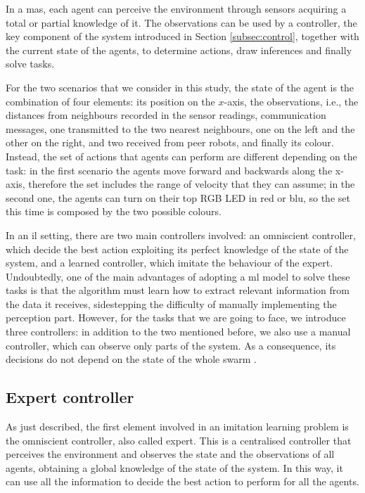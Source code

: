 
In a \gls{mas}, each agent can perceive the environment through sensors 
acquiring a total or partial knowledge of it. The observations can be used by a 
controller, the key component of the system introduced in Section 
\ref{subsec:control}, together with the current state of the agents, to determine 
actions, draw inferences and finally solve tasks. 

For the two scenarios that we consider in this study, the state of the agent is the 
combination of four elements: its position on the $x$-axis, the observations, i.e.,
the distances from neighbours recorded in the sensor readings, communication 
messages, one transmitted to the two nearest neighbours, one on the left and the 
other on the right, and two received from peer robots, and finally its colour.
Instead, the set of actions that agents can perform are different depending on 
the task: in the first scenario the agents move forward and backwards along the 
x-axis, therefore the set includes the range of velocity that they can assume; in the 
second one, the agents  can turn on their top RGB LED in red or blu, so the set this 
time is composed by the two possible colours.

In an \gls{il} setting, there are two main controllers involved: an omniscient 
controller, which decide the best action exploiting its perfect knowledge of the 
state of the system, and a learned controller, which imitate the behaviour of the 
expert.
Undoubtedly, one of the main advantages of adopting a \gls{ml} model to solve 
these tasks is that the algorithm must learn how to extract relevant information 
from the data it receives, sidestepping the difficulty of manually implementing the 
perception part.
However, for the tasks that we are going to face, we introduce three controllers: in 
addition to the two mentioned before, we also use a manual controller, which can 
observe only parts of the system. As a consequence, its decisions do not depend 
on the state of the whole swarm \cite[][]{vsovsic2016inverse}.

\subsection{Expert controller}
\label{subsec:expert}

As just described, the first element involved in an imitation learning problem is 
the omniscient controller, also called expert. 
This is a centralised controller that perceives the environment and observes the 
state and the observations of all agents, obtaining a global knowledge of the state 
of the system. In this way, it can use all the information to decide the best action 
to perform for all the agents. 

